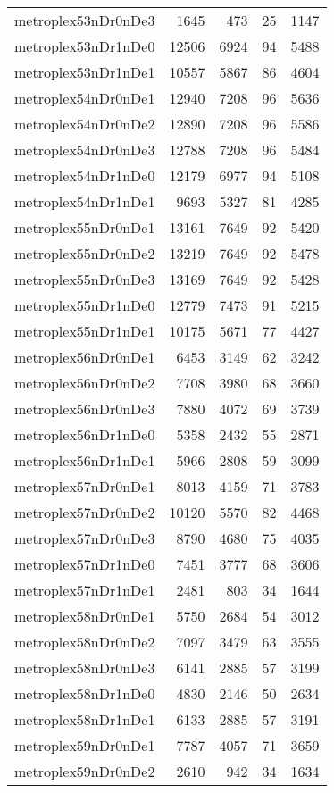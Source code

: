 \documentclass[../../../thesis.tex]{subfiles}
\begin{document}
\begin{longtable}{lrrrr}
metroplex53nDr0nDe3 & 1645 & 473 & 25 & 1147 \\
metroplex53nDr1nDe0 & 12506 & 6924 & 94 & 5488 \\
metroplex53nDr1nDe1 & 10557 & 5867 & 86 & 4604 \\
metroplex54nDr0nDe1 & 12940 & 7208 & 96 & 5636 \\
metroplex54nDr0nDe2 & 12890 & 7208 & 96 & 5586 \\
metroplex54nDr0nDe3 & 12788 & 7208 & 96 & 5484 \\
metroplex54nDr1nDe0 & 12179 & 6977 & 94 & 5108 \\
metroplex54nDr1nDe1 & 9693 & 5327 & 81 & 4285 \\
metroplex55nDr0nDe1 & 13161 & 7649 & 92 & 5420 \\
metroplex55nDr0nDe2 & 13219 & 7649 & 92 & 5478 \\
metroplex55nDr0nDe3 & 13169 & 7649 & 92 & 5428 \\
metroplex55nDr1nDe0 & 12779 & 7473 & 91 & 5215 \\
metroplex55nDr1nDe1 & 10175 & 5671 & 77 & 4427 \\
metroplex56nDr0nDe1 & 6453 & 3149 & 62 & 3242 \\
metroplex56nDr0nDe2 & 7708 & 3980 & 68 & 3660 \\
metroplex56nDr0nDe3 & 7880 & 4072 & 69 & 3739 \\
metroplex56nDr1nDe0 & 5358 & 2432 & 55 & 2871 \\
metroplex56nDr1nDe1 & 5966 & 2808 & 59 & 3099 \\
metroplex57nDr0nDe1 & 8013 & 4159 & 71 & 3783 \\
metroplex57nDr0nDe2 & 10120 & 5570 & 82 & 4468 \\
metroplex57nDr0nDe3 & 8790 & 4680 & 75 & 4035 \\
metroplex57nDr1nDe0 & 7451 & 3777 & 68 & 3606 \\
metroplex57nDr1nDe1 & 2481 & 803 & 34 & 1644 \\
metroplex58nDr0nDe1 & 5750 & 2684 & 54 & 3012 \\
metroplex58nDr0nDe2 & 7097 & 3479 & 63 & 3555 \\
metroplex58nDr0nDe3 & 6141 & 2885 & 57 & 3199 \\
metroplex58nDr1nDe0 & 4830 & 2146 & 50 & 2634 \\
metroplex58nDr1nDe1 & 6133 & 2885 & 57 & 3191 \\
metroplex59nDr0nDe1 & 7787 & 4057 & 71 & 3659 \\
metroplex59nDr0nDe2 & 2610 & 942 & 34 & 1634 \\

\end{longtable}
\end{document}
